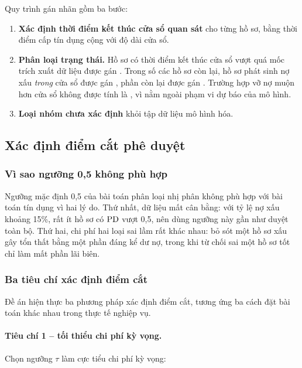 Quy trình gán nhãn gồm ba bước:

\begin{enumerate}[label=(\arabic*)]
  \item \textbf{Xác định thời điểm kết thúc cửa sổ quan sát} cho từng hồ sơ, bằng
  thời điểm cấp tín dụng cộng với độ dài cửa sổ.

  \item \textbf{Phân loại trạng thái.} Hồ sơ có thời điểm kết thúc cửa sổ vượt
  quá mốc trích xuất dữ liệu được gán . Trong số các hồ sơ
  còn lại, hồ sơ phát sinh nợ xấu \textit{trong} cửa sổ được gán , phần
  còn lại được gán . Trường hợp vỡ nợ muộn hơn cửa sổ không được tính
  là , vì nằm ngoài phạm vi dự báo của mô hình.

  \item \textbf{Loại nhóm chưa xác định} khỏi tập dữ liệu mô hình hóa.
\end{enumerate}

\subsection{Xác định điểm cắt phê duyệt}
\label{subsec:diem-cat}

\subsubsection{Vì sao ngưỡng 0,5 không phù hợp}

Ngưỡng mặc định 0,5 của bài toán phân loại nhị phân không phù hợp với bài toán
tín dụng vì hai lý do. Thứ nhất, dữ liệu mất cân bằng: với tỷ lệ nợ xấu khoảng
15\%, rất ít hồ sơ có $\mathrm{PD}$ vượt 0,5, nên dùng ngưỡng này gần như duyệt toàn bộ.
Thứ hai, chi phí hai loại sai lầm rất khác nhau: bỏ sót một hồ sơ xấu gây tổn
thất bằng một phần đáng kể dư nợ, trong khi từ chối sai một hồ sơ tốt chỉ làm mất
phần lãi biên.

\subsubsection{Ba tiêu chí xác định điểm cắt}

Đề án hiện thực ba phương pháp xác định điểm cắt, tương ứng ba cách đặt bài toán
khác nhau trong thực tế nghiệp vụ.

\paragraph{Tiêu chí 1 -- tối thiểu chi phí kỳ vọng.} Chọn ngưỡng $\tau$ làm cực
tiểu chi phí kỳ vọng:

